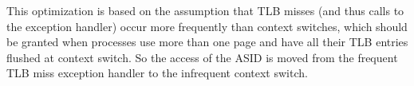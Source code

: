 This optimization is based on the assumption that TLB misses (and thus calls to the exception handler) occur more frequently than context switches, which should be granted when processes use more than one page and have all their TLB entries flushed at context switch.
So the access of the ASID is moved from the frequent TLB miss exception handler to the infrequent context switch. %





